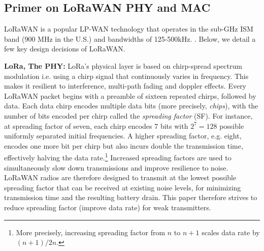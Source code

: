 \subsection{Primer on LoRaWAN PHY and MAC}
\label{sec:lora}

LoRaWAN is a popular LP-WAN technology that operates in the sub-GHz ISM band
(900 MHz in the U.S.) and bandwidths of 125-500kHz. . Below, we
detail a few key design decisions of LoRaWAN.

\noindent \textbf{LoRa, The PHY: } LoRa's physical layer is based on
chirp-spread spectrum modulation i.e. using a chirp signal that continuously
varies in frequency. This makes it resilient to interference, multi-path
fading and doppler effects. Every LoRaWAN packet begins with a preamble of
sixteen repeated chirps, followed by data. Each data chirp encodes multiple
data bits (more precisely, \textit{chips}), with the number of  bits encoded
per chirp called the \textit{spreading factor} (SF). For instance, at
spreading factor of seven, each chirp encodes 7 bits with $2^7 = 128$ possible
uniformly separated initial frequencies. A higher spreading factor, e.g.
eight, encodes one more bit per chirp but also incurs double the transmission
time, effectively halving the data rate.\footnote{More precisely, increasing
spreading factor from $n$ to $n+1$ scales data rate by $(n+1)/2n$.} Increased
spreading factors are used to simultaneously slow down transmissions and
improve resilience to noise. LoRaWAN radios are therefore designed to transmit
at the lowest possible spreading factor that can be received at existing noise
levels, for minimizing transmission time and the resulting battery drain. This
paper therefore strives to reduce spreading factor (improve data rate) for
weak transmitters.



